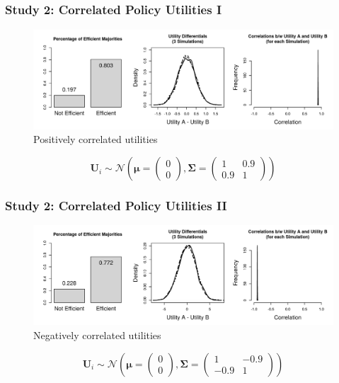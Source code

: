 \documentclass{beamer}
\begin{document}
\subsection{}
\begin{frame}%
  \frametitle{Study 2: Correlated Policy Utilities I}
  \begin{figure}[ht]\centering
    \includegraphics[width=\textwidth]{../simulations/fig/s2a.png}
    \caption{Positively correlated utilities}
  \end{figure}
  $$ \mathbf{U}_{i} \sim \mathcal{N}\left(
    \mathbf{\mu} =\begin{pmatrix}0 \\ 0\end{pmatrix},
    \mathbf{\Sigma} =\begin{pmatrix}1 & 0.9 \\ 0.9 & 1\end{pmatrix}
    \right) $$
\end{frame}
\begin{frame}%
  \frametitle{Study 2: Correlated Policy Utilities II}
  \begin{figure}[ht]\centering
    \includegraphics[width=\textwidth]{../simulations/fig/s2b.png}
    \caption{Negatively correlated utilities}
  \end{figure}
  $$ \mathbf{U}_{i} \sim \mathcal{N}\left(
    \mathbf{\mu} =\begin{pmatrix}0 \\ 0\end{pmatrix},
    \mathbf{\Sigma} =\begin{pmatrix}1 & -0.9 \\ -0.9 & 1\end{pmatrix}
    \right) $$
\end{frame}
\end{document}

